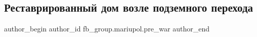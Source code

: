  
 
 
 
 

\subsection{Реставрированный дом возле подземного перехода}
\label{sec:20_01_2023.fb.fb_group.mariupol.pre_war.3.restavrirovannii_dom}

\ifcmt
 author_begin
   author_id fb_group.mariupol.pre_war
 author_end
\fi
